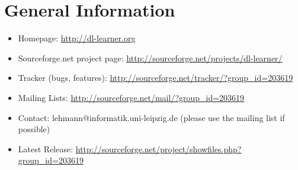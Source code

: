 \documentclass[a4paper,12pt]{scrartcl}
\begin{document}
\section{General Information}
\label{sec:general}
\label{sec:contact}

\begin{itemize}
 \item Homepage: \url{http://dl-learner.org}
 \item Sourceforge.net project page: \url{http://sourceforge.net/projects/dl-learner/}
 \item Tracker (bugs, features): \url{http://sourceforge.net/tracker/?group_id=203619}
 \item Mailing Lists: \url{http://sourceforge.net/mail/?group_id=203619}
 \item Contact: lehmann@informatik.uni-leipzig.de (please use the mailing list if possible)
 \item Latest Release: \url{http://sourceforge.net/project/showfiles.php?group_id=203619}
\end{itemize}



\end{document}
